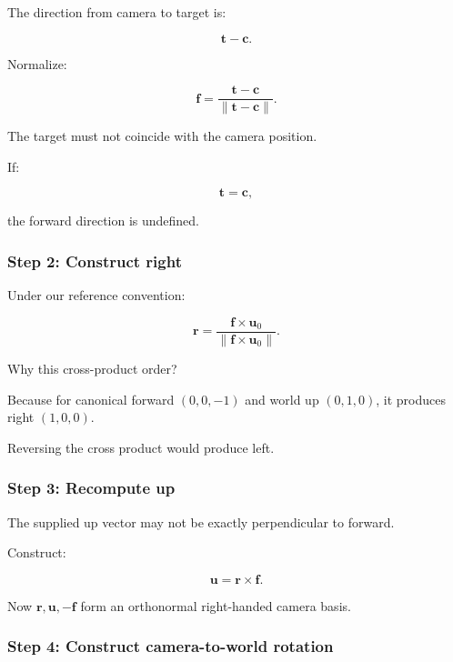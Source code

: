 \hypertarget{02-foundations-ii-ch032-step-1-construct-forward}{}

The direction from camera to target is:

\[
 \mathbf t-\mathbf c.
\]

Normalize:

\[
 \boxed{ \mathbf f= \frac{\mathbf t-\mathbf c} {\|\mathbf t-\mathbf c\|} }.
\]

The target must not coincide with the camera position.

If:

\[
 \mathbf t=\mathbf c,
\]

the forward direction is undefined.

\subsubsection{Step 2: Construct right}\label{02-foundations-ii-ch032-step-2-construct-right}

\hypertarget{02-foundations-ii-ch032-step-2-construct-right}{}

Under our reference convention:

\[
 \boxed{ \mathbf r= \frac{\mathbf f\times\mathbf u_0} {\|\mathbf f\times\mathbf u_0\|} }.
\]

Why this cross-product order?

Because for canonical forward \((0,0,-1)\) and world up \((0,1,0)\), it produces right \((1,0,0)\).

Reversing the cross product would produce left.

\subsubsection{Step 3: Recompute up}\label{02-foundations-ii-ch032-step-3-recompute-up}

\hypertarget{02-foundations-ii-ch032-step-3-recompute-up}{}

The supplied up vector may not be exactly perpendicular to forward.

Construct:

\[
 \boxed{ \mathbf u=\mathbf r\times\mathbf f }.
\]

Now \(\mathbf r,\mathbf u,-\mathbf f\) form an orthonormal right-handed camera basis.

\subsubsection{Step 4: Construct camera-to-world rotation}\label{02-foundations-ii-ch032-step-4-construct-camera-to-world-rotation}

